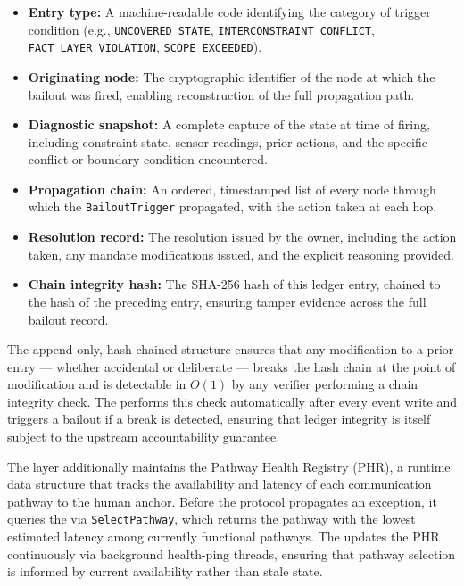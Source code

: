 \begin{itemize}
\item \textbf{Entry type:} A machine-readable code identifying the category of trigger condition (e.g., \texttt{UNCOVERED\_STATE}, \texttt{INTERCONSTRAINT\_CONFLICT}, \texttt{FACT\_LAYER\_VIOLATION}, \texttt{SCOPE\_EXCEEDED}).
\item \textbf{Originating node:} The cryptographic identifier of the \bounds{} node at which the bailout was fired, enabling reconstruction of the full propagation path.
\item \textbf{Diagnostic snapshot:} A complete capture of the \bounds{} state at time of firing, including constraint state, sensor readings, prior actions, and the specific conflict or boundary condition encountered.
\item \textbf{Propagation chain:} An ordered, timestamped list of every node through which the \texttt{BailoutTrigger} propagated, with the action taken at each hop.
\item \textbf{Resolution record:} The resolution issued by the \purpose{} owner, including the action taken, any mandate modifications issued, and the explicit reasoning provided.
\item \textbf{Chain integrity hash:} The SHA-256 hash of this ledger entry, chained to the hash of the preceding entry, ensuring tamper evidence across the full bailout record.
\end{itemize}

The append-only, hash-chained structure ensures that any modification to a prior entry — whether accidental or deliberate — breaks the hash chain at the point of modification and is detectable in $O(1)$ by any verifier performing a chain integrity check. The \fact{} performs this check automatically after every event write and triggers a bailout if a break is detected, ensuring that ledger integrity is itself subject to the upstream accountability guarantee.

The \fact{} layer additionally maintains the Pathway Health Registry (PHR), a runtime data structure that tracks the availability and latency of each communication pathway to the human anchor. Before the protocol propagates an exception, it queries the \fact{} via \texttt{SelectPathway}, which returns the pathway with the lowest estimated latency among currently functional pathways. The \fact{} updates the PHR continuously via background health-ping threads, ensuring that pathway selection is informed by current availability rather than stale state.

